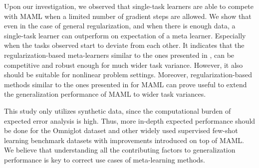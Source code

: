 Upon our investigation, we observed that single-task learners are able to compete with MAML when a limited number of gradient steps are allowed. We show that even in the case of general regularization, and when there is enough data, a single-task learner can outperform on expectation of a meta learner. Especially when the tasks observed start to deviate from each other. It indicates that the regularization-based meta-learners similar to the ones presented in \cite{denevi2018}, can be competitive and robust enough for much wider task variance. However, it also should be suitable for nonlinear problem settings.  Moreover, regularization-based methods similar to the ones presented in \cite{guiroy2019} for MAML can prove useful to extend the generalization performance of MAML to wider task variances. 

This study only utilizes synthetic data, since the computational burden of expected error analysis is high. Thus, more in-depth expected performance should be done for the Omniglot dataset and other widely used supervised few-shot learning benchmark datasets with improvements introduced on top of MAML. We believe that understanding all the contributing factors to generalization performance is key to correct use cases of meta-learning methods.


